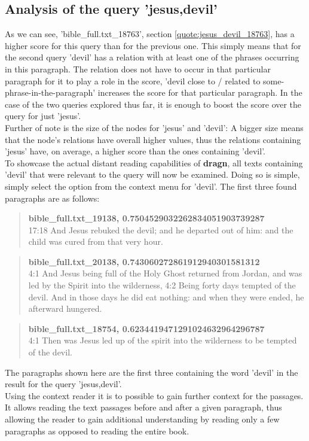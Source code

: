\clearpage
\subsection{Analysis of the query 'jesus,devil'}
\label{subsec:analysis_jesus,devil}
As we can see, 'bible\_full.txt\_18763', section \ref{quote:jesus_devil_18763}, has a higher score for this query than for the previous one. This simply means that for the second query 'devil' has a relation with at least one of the phrases occurring in this paragraph. The relation does not have to occur in that particular paragraph for it to play a role in the score, 'devil close to / related to some-phrase-in-the-paragraph' increases the score for that particular paragraph. In the case of the two queries explored thus far, it is enough to boost the score over the query for just 'jesus'.\\
Further of note is the size of the nodes for 'jesus' and 'devil': A bigger size means that the node's relations have overall higher values, thus the relations containing 'jesus' have, on average, a higher score than the ones containing 'devil'.\\
To showcase the actual distant reading capabilities of \textbf{dragn}, all texts containing 'devil' that were relevant to the query will now be examined. Doing so is simple, simply select the option from the context menu for 'devil'. The first three found paragraphs are as follows:
\blockquote{
\textbf{bible\_full.txt\_19138, 0.7504529032262834051903739287}\\
17:18 And Jesus rebuked the devil; and he departed out of him: and the child was cured from that very hour.}
\blockquote{
\textbf{bible\_full.txt\_20138, 0.743060272861912940301581312}\\
4:1 And Jesus being full of the Holy Ghost returned from Jordan, and was led by the Spirit into the wilderness, 4:2 Being forty days tempted of the devil. And in those days he did eat nothing: and when they were ended, he afterward hungered.}
\blockquote{
\textbf{bible\_full.txt\_18754, 0.6234419471291024632964296787}\\
4:1 Then was Jesus led up of the spirit into the wilderness to be tempted of the devil.}
The paragraphs shown here are the first three containing the word 'devil' in the result for the query 'jesus,devil'.\\
Using the context reader it is to possible to gain further context for the passages. It allows reading the text passages before and after a given paragraph, thus allowing the reader to gain additional understanding by reading only a few paragraphs as opposed to reading the entire book.\\
